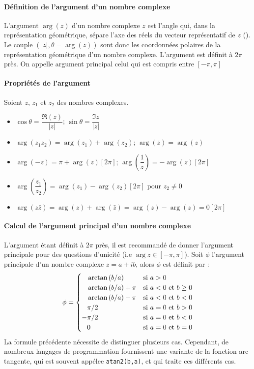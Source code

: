 \paragraph{Définition de l'argument d'un nombre complexe}
L'argument $\arg{(z)}$ d'un nombre complexe $z$ est l'angle qui, dans la représentation géométrique, sépare l'axe des réels du vecteur représentatif de $z$ ().
Le couple $(|z|,\theta=\arg{(z)})$ sont donc les coordonnées polaires de la représentation géométrique d'un nombre complexe.
L'argument est définit à $2\pi$ près. On appelle argument principal celui qui est compris entre $[-\pi,\pi]$

\newpage
\paragraph{Propriétés de l'argument}
Soient $z$, $z_1$ et $z_2$ des nombres complexes.
\begin{itemize}
    \item $\cos\theta=\dfrac{\Re(z)}{|z|}$; $\sin\theta=\dfrac{\Im{z}}{|z|}$
    \item $\arg(z_1z_2)=\arg(z_1)+\arg(z_2)$; $\arg(\bar{z})=\arg(z)$
    \item $\arg(-z)=\pi+\arg(z)[2\pi]$; $\arg\left(\dfrac{1}{z}\right)=-\arg(z)[2\pi]$
    \item $\arg\left(\dfrac{z_1}{z_2}\right)=\arg(z_1)-\arg(z_2)[2\pi]$ pour $z_2\neq0$
    \item $\arg(z\bar{z})=\arg(z)+\arg(\bar{z})=\arg(z)-\arg(z)=0[2\pi]$
\end{itemize}

\paragraph{Calcul de l'argument principal d'un nombre complexe}
L'argument étant définit à $2\pi$ près, il est recommandé de donner l'argument principale 
pour des questions d'unicité (i.e $\arg{z}\in[-\pi,\pi]$). 
Soit $\phi$ l'argument principale d'un nombre complexe $z=a+ib$, alors $\phi$ est définit par :
$$
\phi=
\begin{cases}
    \hphantom{-}\arctan{(b/a)}     & \text{si $a>0$} \\
    \hphantom{-}\arctan{(b/a)}+\pi & \text{si $a<0$ et $b\ge0$} \\
    \hphantom{-}\arctan{(b/a)}-\pi & \text{si $a<0$ et $b<0$} \\
    \hphantom{-} \pi/2             & \text{si $a=0$ et $b>0$} \\
                -\pi/2             & \text{si $a=0$ et $b<0$} \\
    \hphantom{-}0                  & \text{si $a=0$ et $b=0$} \\
\end{cases}
$$
La formule précédente nécessite de distinguer plusieurs cas.
Cependant, de nombreux langages de programmation fournissent
une variante de la fonction arc tangente, qui est souvent appélee
\verb?atan2(b,a)?, et qui traite ces différents cas. 

